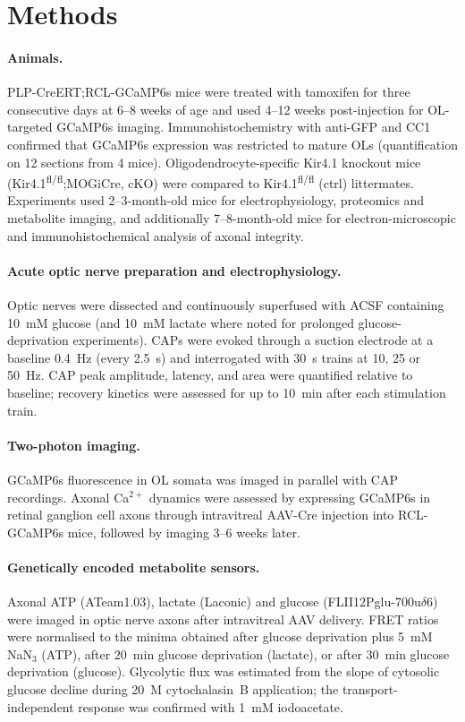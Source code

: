 \documentclass[11pt,a4paper]{article}
\begin{document}
\section{Methods}

\paragraph{Animals.} PLP-CreERT;RCL-GCaMP6s mice were treated with tamoxifen for three consecutive days at 6--8 weeks of age and used 4--12 weeks post-injection for OL-targeted GCaMP6s imaging. Immunohistochemistry with anti-GFP and CC1 confirmed that GCaMP6s expression was restricted to mature OLs (quantification on 12 sections from 4 mice). Oligodendrocyte-specific Kir4.1 knockout mice (Kir4.1\textsuperscript{fl/fl};MOGiCre, cKO) were compared to Kir4.1\textsuperscript{fl/fl} (ctrl) littermates. Experiments used 2--3-month-old mice for electrophysiology, proteomics and metabolite imaging, and additionally 7--8-month-old mice for electron-microscopic and immunohistochemical analysis of axonal integrity.

\paragraph{Acute optic nerve preparation and electrophysiology.} Optic nerves were dissected and continuously superfused with ACSF containing 10~mM glucose (and 10~mM lactate where noted for prolonged glucose-deprivation experiments). CAPs were evoked through a suction electrode at a baseline 0.4~Hz (every 2.5~s) and interrogated with 30~s trains at 10, 25 or 50~Hz. CAP peak amplitude, latency, and area were quantified relative to baseline; recovery kinetics were assessed for up to 10~min after each stimulation train.

\paragraph{Two-photon imaging.} GCaMP6s fluorescence in OL somata was imaged in parallel with CAP recordings. Axonal Ca$^{2+}$ dynamics were assessed by expressing GCaMP6s in retinal ganglion cell axons through intravitreal AAV-Cre injection into RCL-GCaMP6s mice, followed by imaging 3--6 weeks later.

\paragraph{Genetically encoded metabolite sensors.} Axonal ATP (ATeam1.03), lactate (Laconic) and glucose (FLII12Pglu-700u$\delta$6) were imaged in optic nerve axons after intravitreal AAV delivery. FRET ratios were normalised to the minima obtained after glucose deprivation plus 5~mM NaN$_3$ (ATP), after 20~min glucose deprivation (lactate), or after 30~min glucose deprivation (glucose). Glycolytic flux was estimated from the slope of cytosolic glucose decline during 20~\textmu M cytochalasin~B application; the transport-independent response was confirmed with 1~mM iodoacetate.
\end{document}
